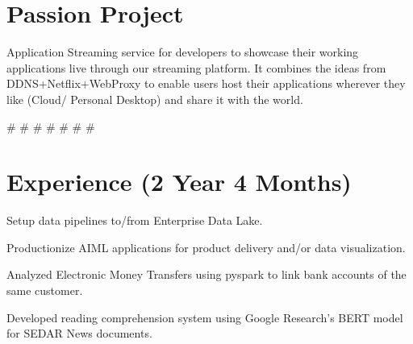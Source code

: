 \documentclass[]{Vishnu-Resume}
\begin{document}
\hfill
\begin{minipage}[t]{0.66\textwidth} 

\section{Passion Project}
\vspace{\topsep} %
\begin{tightemize}
\item Application Streaming service for developers to showcase their working applications live through our streaming platform. It combines the ideas from DDNS+Netflix+WebProxy to enable users host their applications wherever they like (Cloud/ Personal Desktop) and share it with the world.
\end{tightemize}
\#  \#  \# \# \#  \#  \#
\sectionsep
\sectionsep

\section{Experience (2 Year 4 Months)}

\descript{}
\begin{tightemize}
\item Setup data pipelines to/from Enterprise Data Lake.
\item Productionize AIML applications for product delivery and/or data visualization.
\end{tightemize}
\sectionsep

\begin{tightemize}
\item Analyzed Electronic Money Transfers using pyspark to link bank accounts of the same customer.
\item Developed reading comprehension system using Google Research's BERT model for SEDAR News documents.
\end{tightemize}
\sectionsep


\end{minipage}
\end{document}
